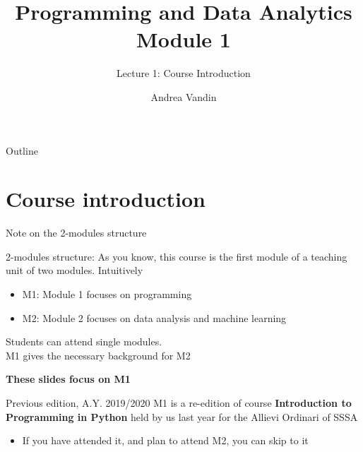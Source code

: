 \documentclass{beamer}%
\title{Programming and Data Analytics\\ Module 1
}
\subtitle{Lecture 1: Course Introduction}
\date{%
}
\begin{document}
\frame{\titlepage}
\author{Andrea Vandin}


\begin{frame}{Outline}
\tableofcontents
\end{frame}

\section{Course introduction}

\begin{frame}{Note on the 2-modules structure}
	\begin{block}{2-modules structure: \myurl{\homepage}}
		As you know, this course is the first module of a teaching unit of two modules. Intuitively
		\begin{itemize}
			\item M1: Module 1 focuses on programming
			\item M2: Module 2 focuses  on data analysis and machine learning
		\end{itemize}
		Students can attend single modules. \\ M1 gives the necessary background for M2
		\begin{center}\textbf{These slides focus on M1}\end{center}
	\end{block}	
\pause
	\begin{block}{Previous edition, A.Y. 2019/2020}
		M1 is a re-edition of course \textbf{Introduction to Programming in Python} held by us 
		last year for the Allievi Ordinari of SSSA
		\begin{itemize}
			\item If you have attended it, and plan to attend M2, you can skip to it
		\end{itemize}
	\end{block}
\end{frame}
\end{document}
